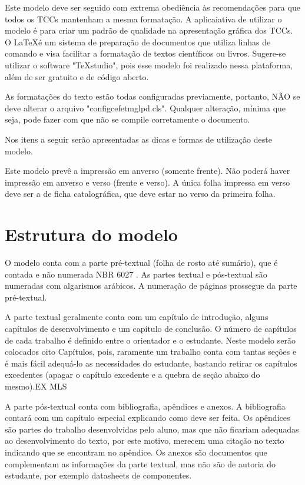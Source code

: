 \documentclass[
        oneside,      %
        english,			
        brazil			 
        ]{configcefetmglpd}
\begin{document}
Este modelo deve ser seguido com extrema obediência às recomendações para que todos os TCCs mantenham a mesma formatação. A aplicaiativa de utilizar o modelo é para criar um padrão de qualidade na apresentação gráfica dos TCCs. O \LaTeX é um sistema de preparação de documentos que utiliza linhas de comando e visa facilitar a formatação de textos científicos ou livros. Sugere-se utilizar o software "TeXstudio", pois esse modelo foi realizado nessa plataforma, além de ser gratuito e de código aberto. %

As formatações do texto estão todas configuradas previamente, portanto, NÃO se deve alterar o arquivo "configcefetmglpd.cls". Qualquer alteração, mínima que seja, pode fazer com que não se compile corretamente o documento.

Nos itens a seguir serão apresentadas as dicas e formas de utilização deste modelo.

Este modelo prevê a impressão em anverso (somente frente). Não poderá haver impressão em anverso e verso (frente e verso). A única folha impressa em verso deve ser a de ficha catalográfica, que deve estar no verso da primeira folha.


\section{Estrutura do modelo} %
\label{sec:estrutura_modelo}  %
O modelo conta com a parte pré-textual (folha de rosto até sumário), que é contada e não numerada NBR 6027 \cite{bib:abnt6027}. As partes textual e pós-textual são numeradas com algarismos arábicos. A numeração de páginas prossegue da parte pré-textual.

A parte textual geralmente conta com um capítulo de introdução, alguns capítulos de desenvolvimento e um capítulo de conclusão. O número de capítulos de cada trabalho é definido entre o orientador e o estudante. Neste modelo serão colocados oito Capítulos, pois, raramente um trabalho conta com tantas seções e é mais fácil adequá-lo as necessidades do estudante, bastando retirar os capítulos excedentes (apagar o capítulo excedente e a quebra de seção abaixo do mesmo).\ac{EX} \ac{MLS}

A parte pós-textual conta com bibliografia, apêndices e anexos. A bibliografia contará com um capítulo especial explicando como deve ser feita. Os apêndices são partes do trabalho desenvolvidas pelo aluno, mas que não ficariam adequadas ao desenvolvimento do texto, por este motivo, merecem uma citação no texto indicando que se encontram no apêndice. Os anexos são documentos que complementam as informações da parte textual, mas não são de autoria do estudante, por exemplo datasheets de componentes.
\end{document}
